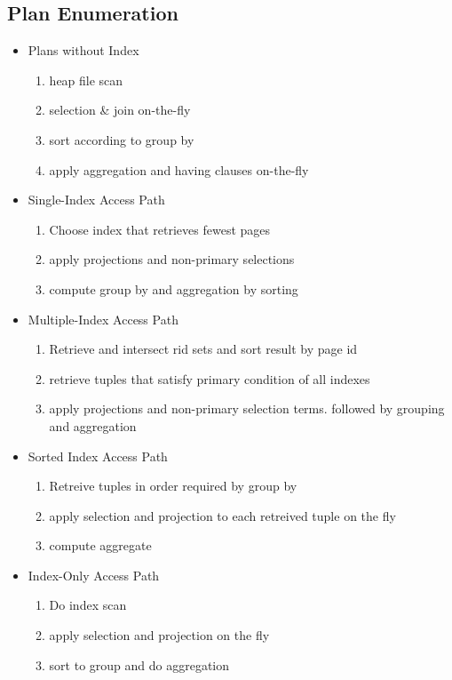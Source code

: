\documentclass[a4paper]{article}
\begin{document}
\begin{twocolumn}
\subsection{Plan Enumeration}
\begin{itemize}
	\item Plans without Index
	\begin{enumerate}
		\item heap file scan
		\item selection \& join on-the-fly
		\item sort according to group by
		\item apply aggregation and having clauses on-the-fly
	\end{enumerate}
	\item Single-Index Access Path
	\begin{enumerate}
		\item Choose index that retrieves fewest pages
		\item apply projections and non-primary selections
		\item compute group by and aggregation by sorting
	\end{enumerate}
	\item Multiple-Index Access Path
	\begin{enumerate}
		\item Retrieve and intersect rid sets and sort result by page id
		\item retrieve tuples that satisfy primary condition of all indexes
		\item apply projections and non-primary selection terms. followed by grouping and aggregation
	\end{enumerate}
	\item Sorted Index Access Path
	\begin{enumerate}
		\item Retreive tuples in order required by group by
		\item apply selection and projection to each retreived tuple on the fly
		\item compute aggregate
	\end{enumerate}
	\item Index-Only Access Path
	\begin{enumerate}
		\item Do index scan
		\item apply selection and projection on the fly
		\item sort to group and do aggregation
	\end{enumerate}
\end{itemize}



\end{twocolumn}
\end{document}
